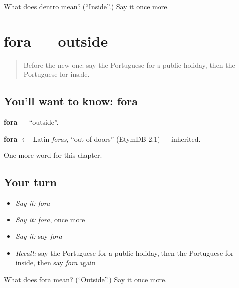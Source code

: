 \begin{tcolorbox}[breakable,colback=teal!4,colframe=teal!35!black,title={Before you move on}]
What does dentro mean? (\textquotedblleft{}Inside\textquotedblright{}.) Say it once more.
\end{tcolorbox}
\section[fora]{fora — outside}

\label{lesson:PT-C213-fora}



\begin{quote}
Before the new one: say the Portuguese for a public holiday, then the Portuguese for inside.
\end{quote}

\subsection*{You'll want to know: fora}
\textbf{fora} — \textquotedblleft{}outside\textquotedblright{}.

\begin{cousinweb}
\textbf{fora} $\leftarrow$ Latin \emph{foras}, \textquotedblleft{}out of doors\textquotedblright{} (EtymDB 2.1) — inherited.
\end{cousinweb}

\begin{grammarlens}[title={What you've built}]
One more word for this chapter.
\end{grammarlens}

\subsection*{Your turn}
\begin{itemize}
\raggedright
  \item \emph{Say it:} \emph{fora}
  \item \emph{Say it:} \emph{fora}, once more
  \item \emph{Say it:} say \emph{fora}
  \item \emph{Recall:} say the Portuguese for a public holiday, then the Portuguese for inside, then say \emph{fora} again
\end{itemize}

\begin{tcolorbox}[breakable,colback=teal!4,colframe=teal!35!black,title={Before you move on}]
What does fora mean? (\textquotedblleft{}Outside\textquotedblright{}.) Say it once more.
\end{tcolorbox}
